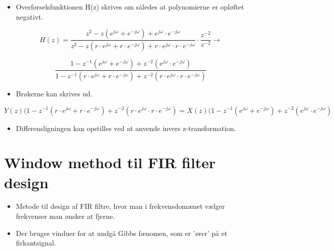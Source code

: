 \documentclass[danish]{article}
\begin{document}
\begin{itemize}
	\item Overførselsfunktionen H(z) skrives om således at polynomierne er opløftet negativt.
\end{itemize}

\begin{equation}
H(z) = \frac{z^2 - z(e^{j\omega}+e^{-j\omega}) + e^{j\omega}\cdot e^{-j\omega}}{z^2 - z(r\cdot e^{j\omega}+r\cdot e^{-j\omega}) + r\cdot e^{j\omega}\cdot r\cdot e^{-j\omega}} \cdot \frac{z^{-2}}{z^{-2}} \longrightarrow 
\end{equation}

\begin{equation}
\frac{1 - z^{-1}(e^{j\omega}+e^{-j\omega}) + z^{-2}(e^{j\omega}\cdot e^{-j\omega})}{1 - z^{-1}(r\cdot e^{j\omega}+r\cdot e^{-j\omega}) + z^{-2}(r\cdot e^{j\omega}\cdot r\cdot e^{-j\omega})}
\end{equation}

\begin{itemize}
	\item Brøkerne kan skrives ud.
\end{itemize}

\begin{equation}
Y(z)(1-z^{-1}(r\cdot e^{j\omega}+r\cdot e^{-j\omega})+z^{-2}(r\cdot e^{j\omega}\cdot r\cdot e^{-j\omega}) = X(z)(1-z^{-1}(e^{j\omega}+e^{-j\omega})+z^{-2}(e^{j\omega}\cdot e^{-j\omega})
\end{equation}

\begin{itemize}
	\item Differensligningen kan opstilles ved at anvende invers z-transformation.
\end{itemize}





\newpage
\section{Window method til FIR filter design}

\begin{itemize}
	\item Metode til design af FIR filtre, hvor man i frekvensdomænet vælger frekvenser man ønsker at fjerne.
	\item Der bruges vinduer for at undgå Gibbs fænomen, som er 'ører' på et firkantsignal.
\end{itemize}
\end{document}
